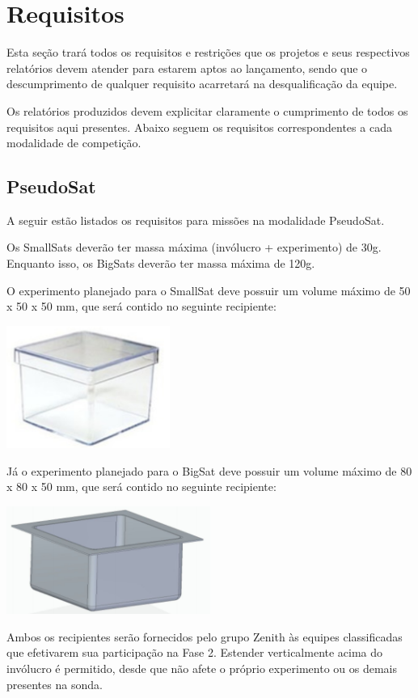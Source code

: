 \section{Requisitos}

    Esta seção trará todos os requisitos e restrições que os projetos e seus respectivos relatórios devem atender para estarem aptos ao lançamento, sendo que o descumprimento de qualquer requisito acarretará na desqualificação da equipe.
    
    Os relatórios produzidos devem explicitar claramente o cumprimento de todos os requisitos aqui presentes. Abaixo seguem os requisitos correspondentes a cada modalidade de competição.

    \subsection{PseudoSat}    
    A seguir estão listados os requisitos para missões na modalidade PseudoSat.

    \begin{definition}[1]
    Os SmallSats deverão ter massa máxima (invólucro + experimento) de 30g. Enquanto isso, os BigSats deverão ter massa máxima de 120g.
    \end{definition}
    
    \begin{definition}[2]
    O experimento planejado para o SmallSat deve possuir um volume máximo de 50 x 50 x 50 mm, que será contido no seguinte recipiente:
    
    \centering\includegraphics[width=0.4\textwidth]{Figures/smallsat.png}
    
    \justifying Já o experimento planejado para o BigSat deve possuir um volume máximo de 80 x 80 x 50 mm, que será contido no seguinte recipiente:
    
    \centering\includegraphics[width=0.5\textwidth]{Figures/bigsat.png}
    
    \justifying Ambos os recipientes serão fornecidos pelo grupo Zenith às equipes classificadas que efetivarem sua participação na Fase 2. Estender verticalmente acima do invólucro é permitido, desde que não afete o próprio experimento ou os demais presentes na sonda.
    \end{definition}
    
